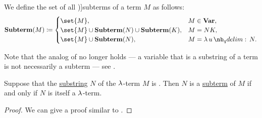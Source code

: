 \begin{definition}\label{def:lambda_subterm}
  We define the set of all \term[ru=подтерм (\cite[189]{Герасимов2011})]{subterms} of a term \( M \) as follows:
  \begin{equation*}
    \op*{Subterm}(M) \coloneqq \begin{cases}
      \set{ M },                                             &M \in \op*{Var}, \\
      \set{ M } \cup \op*{Subterm}(N) \cup \op*{Subterm}(K), &M = N K, \\
      \set{ M } \cup \op*{Subterm}(N),                       &M = \qabs u N.
    \end{cases}
  \end{equation*}
\end{definition}
\begin{comments}
  \item Note that the analog of  no longer holds --- a variable that is a substring of a term is not necessarily a subterm --- see .
\end{comments}

\begin{proposition}\label{thm:lambda_subterm_characterization}
  Suppose that the \hyperref[def:formal_language/substring]{substring} \( N \) of the \( \mathrm{\lambda} \)-term \( M \) is . Then \( N \) is a \hyperref[def:lambda_subterm]{subterm} of \( M \) if and only if \( N \) is itself a \( \mathrm{\lambda} \)-term.
\end{proposition}
\begin{proof}
  We can give a proof similar to .
\end{proof}

